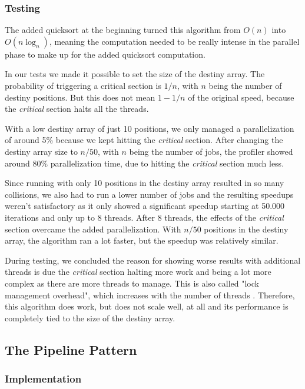 \documentclass[10pt,journal]{IEEEtran}
\begin{document}
\subsubsection{Testing}

The added quicksort at the beginning turned this algorithm from $ O(n) $ into $ O(n\log_n) $, meaning the computation needed to be really intense in the parallel phase to make up for the added quicksort computation. 

In our tests we made it possible to set the size of the destiny array. The probability of triggering a critical section is $ 1 / n $, with $ n $ being the number of destiny positions. But this does not mean $ 1 - 1 / n $ of the original speed, because the \textit{critical} section halts all the threads. 

With a low destiny array of just 10 positions, we only managed a parallelization of around 5\% because we kept hitting the \textit{critical} section. After changing the destiny array size to $ n / 50 $, with $ n $ being the number of jobs, the profiler showed around 80\% parallelization time, due to hitting the \textit{critical} section much less.

Since running with only 10 positions in the destiny array resulted in so many collisions, we also had to run a lower number of jobs and the resulting speedups weren't satisfactory as it only showed a significant speedup starting at 50.000 iterations and only up to 8 threads. After 8 threads, the effects of the \textit{critical} section overcame the added parallelization. With $ n / 50 $ positions in the destiny array, the algorithm ran a lot faster, but the speedup was relatively similar. 

During testing, we concluded the reason for showing worse results with additional threads is due the \textit{critical} section halting more work and being a lot more complex as there are more threads to manage. This is also called "lock management overhead", which increases with the number of threads \cite{lockmanage}. Therefore, this algorithm does work, but does not scale well, at all and its performance is completely tied to the size of the destiny array.

\subsection{The Pipeline Pattern}
\subsubsection{Implementation}
\end{document}
